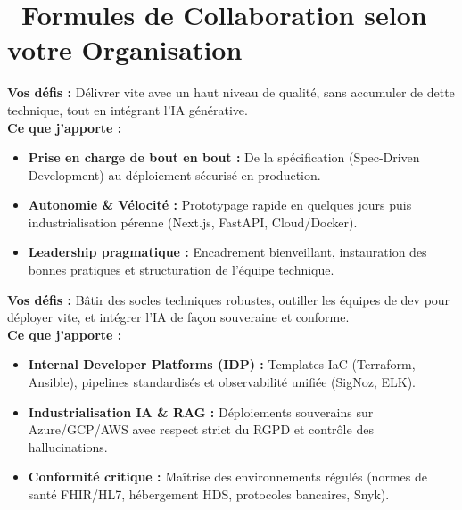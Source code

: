 \documentclass[10pt,a4paper]{article}
\begin{document}
\newpage

\section{\faHandshake\ Formules de Collaboration selon votre Organisation}

\begin{tcolorbox}[
    colback=white,
    colframe=brandTeal!80,
    arc=4pt,
    boxrule=0.8pt,
    title={\small\bfseries\faRocket\ 1. Pour les Startups, Scale-ups \& PME innovantes : Lead Tech Fullstack \& IA},
    coltitle=white,
    colbacktitle=brandTeal,
    top=5pt,bottom=5pt,left=8pt,right=8pt
]
\textbf{Vos défis :} Délivrer vite avec un haut niveau de qualité, sans accumuler de dette technique, tout en intégrant l'IA générative.\\
\textbf{Ce que j'apporte :}
\begin{itemize}[leftmargin=1.2em, itemsep=0.1em]
    \item \textbf{Prise en charge de bout en bout :} De la spécification (Spec-Driven Development) au déploiement sécurisé en production.
    \item \textbf{Autonomie \& Vélocité :} Prototypage rapide en quelques jours puis industrialisation pérenne (Next.js, FastAPI, Cloud/Docker).
    \item \textbf{Leadership pragmatique :} Encadrement bienveillant, instauration des bonnes pratiques et structuration de l'équipe technique.
\end{itemize}
\end{tcolorbox}

\vspace{0.3em}

\begin{tcolorbox}[
    colback=white,
    colframe=darkgray!80,
    arc=4pt,
    boxrule=0.8pt,
    title={\small\bfseries\faBuilding\ 2. Pour les Grands Comptes \& ETI (Banque, Assurance, Santé) : Platform Engineer ou Architecte Cloud},
    coltitle=white,
    colbacktitle=darkgray,
    top=5pt,bottom=5pt,left=8pt,right=8pt
]
\textbf{Vos défis :} Bâtir des socles techniques robustes, outiller les équipes de dev pour déployer vite, et intégrer l'IA de façon souveraine et conforme.\\
\textbf{Ce que j'apporte :}
\begin{itemize}[leftmargin=1.2em, itemsep=0.1em]
    \item \textbf{Internal Developer Platforms (IDP) :} Templates IaC (Terraform, Ansible), pipelines standardisés et observabilité unifiée (SigNoz, ELK).
    \item \textbf{Industrialisation IA \& RAG :} Déploiements souverains sur Azure/GCP/AWS avec respect strict du RGPD et contrôle des hallucinations.
    \item \textbf{Conformité critique :} Maîtrise des environnements régulés (normes de santé FHIR/HL7, hébergement HDS, protocoles bancaires, Snyk).
\end{itemize}
\end{tcolorbox}
\end{document}
